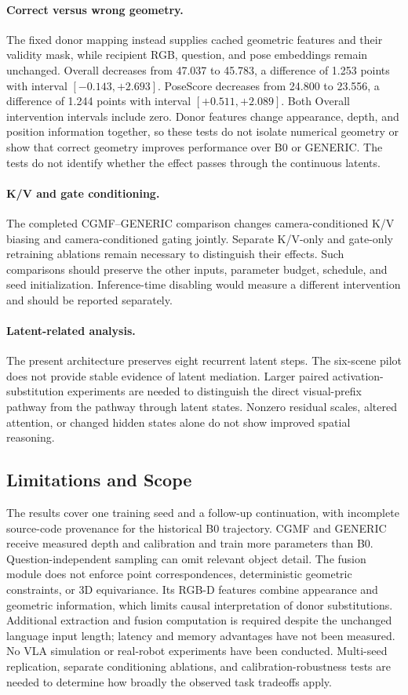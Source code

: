 \paragraph{Correct versus wrong geometry.}
The fixed donor mapping instead supplies cached geometric features and their validity mask, while recipient RGB, question, and pose embeddings remain unchanged. Overall decreases from 47.037 to 45.783, a difference of 1.253 points with interval $[-0.143,+2.693]$. PoseScore decreases from 24.800 to 23.556, a difference of 1.244 points with interval $[+0.511,+2.089]$. Both Overall intervention intervals include zero. Donor features change appearance, depth, and position information together, so these tests do not isolate numerical geometry or show that correct geometry improves performance over B0 or GENERIC. The tests do not identify whether the effect passes through the continuous latents.

\paragraph{K/V and gate conditioning.}
The completed CGMF--GENERIC comparison changes camera-conditioned K/V biasing and camera-conditioned gating jointly. Separate K/V-only and gate-only retraining ablations remain necessary to distinguish their effects. Such comparisons should preserve the other inputs, parameter budget, schedule, and seed initialization. Inference-time disabling would measure a different intervention and should be reported separately.

\paragraph{Latent-related analysis.}
The present architecture preserves eight recurrent latent steps. The six-scene pilot does not provide stable evidence of latent mediation. Larger paired activation-substitution experiments are needed to distinguish the direct visual-prefix pathway from the pathway through latent states. Nonzero residual scales, altered attention, or changed hidden states alone do not show improved spatial reasoning.

\subsection{Limitations and Scope}
The results cover one training seed and a follow-up continuation, with incomplete source-code provenance for the historical B0 trajectory. CGMF and GENERIC receive measured depth and calibration and train more parameters than B0. Question-independent sampling can omit relevant object detail. The fusion module does not enforce point correspondences, deterministic geometric constraints, or 3D equivariance. Its RGB-D features combine appearance and geometric information, which limits causal interpretation of donor substitutions. Additional extraction and fusion computation is required despite the unchanged language input length; latency and memory advantages have not been measured. No VLA simulation or real-robot experiments have been conducted. Multi-seed replication, separate conditioning ablations, and calibration-robustness tests are needed to determine how broadly the observed task tradeoffs apply.
